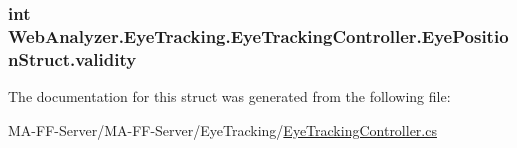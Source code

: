 \subsubsection[{validity}]{\setlength{\rightskip}{0pt plus 5cm}int Web\+Analyzer.\+Eye\+Tracking.\+Eye\+Tracking\+Controller.\+Eye\+Position\+Struct.\+validity}\label{struct_web_analyzer_1_1_eye_tracking_1_1_eye_tracking_controller_1_1_eye_position_struct_aac8d81bc2c121face2cf0ef08bdb4199}


The documentation for this struct was generated from the following file\+:\begin{DoxyCompactItemize}
\item 
M\+A-\/\+F\+F-\/\+Server/\+M\+A-\/\+F\+F-\/\+Server/\+Eye\+Tracking/\hyperlink{_eye_tracking_controller_8cs}{Eye\+Tracking\+Controller.\+cs}\end{DoxyCompactItemize}
